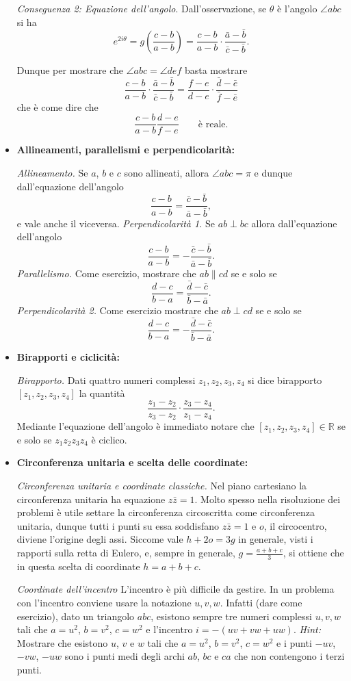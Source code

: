 \begin{itemize}
\emph{Conseguenza 2: Equazione dell'angolo}. Dall'osservazione, se $\theta$ è l'angolo $\angle abc$ si ha 
$$
e^{2i\theta}=g\left(\frac{c-b}{a-b}\right)=\frac{c-b}{a-b}\cdot \frac{\bar a-\bar b}{\bar c-\bar b}.
$$

Dunque per mostrare che $\angle abc=\angle def$ basta mostrare 
$$
\frac{c-b}{a-b}\cdot \frac{\bar a-\bar b}{\bar c-\bar b}=\frac{f-e}{d-e}\cdot \frac{\bar d-\bar e}{\bar f-\bar e}
$$
che è come dire che
$$
\frac{c-b}{a-b}\frac{d-e}{f-e} \qquad \mbox{è reale}.
$$
\item \textbf{Allineamenti, parallelismi e perpendicolarità:}

\emph{Allineamento.} Se $a$, $b$ e $c$ sono allineati, allora $\angle abc=\pi$ e dunque dall'equazione dell'angolo 
$$
\frac{c-b}{a-b}=\frac{\bar c-\bar b}{\bar a-\bar b},
$$
e vale anche il viceversa. 
\emph{Perpendicolarità 1.} Se $ab\perp bc$ allora dall'equazione dell'angolo 
$$
\frac{c-b}{a-b}=-\frac{\bar c-\bar b}{\bar a-\bar b}.
$$
\emph{Parallelismo.} Come esercizio, mostrare che $ab\parallel cd$ se e solo se 
$$
\frac{d-c}{b-a}=\frac{\bar d-\bar c}{\bar b-\bar a}.
$$
\emph{Perpendicolarità 2.} Come esercizio mostrare che $ab\perp cd$ se e solo se 
$$
\frac{d-c}{b-a}=-\frac{\bar d-\bar c}{\bar b-\bar a}.
$$
\item \textbf{Birapporti e ciclicità:}

\emph{Birapporto.} Dati quattro numeri complessi $z_1,z_2,z_3,z_4$ si dice birapporto $[z_1,z_2,z_3,z_4]$ la quantità
$$
\frac{z_1-z_2}{z_3-z_2}\cdot \frac{z_3-z_4}{z_1-z_4}.
$$
Mediante l'equazione dell'angolo è immediato notare che $[z_1,z_2,z_3,z_4] \in \mathbb R$ se e solo se $z_1z_2z_3z_4$ è ciclico.

\item \textbf{Circonferenza unitaria e scelta delle coordinate:}
 
\emph{Circonferenza unitaria e coordinate classiche.} Nel piano cartesiano la circonferenza unitaria ha equazione $z\bar z=1$. Molto spesso nella risoluzione dei problemi è utile settare la circonferenza circoscritta come circonferenza unitaria, dunque tutti i punti su essa soddisfano $z\bar z=1$ e $o$, il circocentro, diviene l'origine degli assi. Siccome vale $h+2o=3g$ in generale, visti i rapporti sulla retta di Eulero, e, sempre in generale, $g=\frac{a+b+c}{3}$, si ottiene che in questa scelta di coordinate $h=a+b+c$.

\emph{Coordinate dell'incentro} L'incentro è più difficile da gestire. In un problema con l'incentro conviene usare la notazione $u,v,w$. Infatti (dare come esercizio), dato un triangolo $abc$, esistono sempre tre numeri complessi $u,v,w$ tali che $a=u^2$, $b=v^2$, $c=w^2$ e l'incentro $i=-(uv+vw+uw)$. \emph{Hint:} Mostrare che esistono $u$, $v$ e $w$ tali che $a=u^2$, $b=v^2$, $c=w^2$ e i punti $-uv$, $-vw$, $-uw$ sono i punti medi degli archi $ab$, $bc$ e $ca$ che non contengono i terzi punti. 


\end{itemize}
